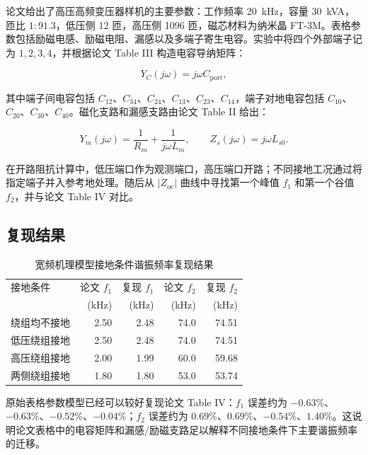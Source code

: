 \documentclass[UTF8,a4paper,12pt]{ctexart}
\begin{document}
论文给出了高压高频变压器样机的主要参数：工作频率 \SI{20}{kHz}，容量 \SI{30}{kVA}，匝比 $1:91.3$，低压侧 12 匝，高压侧 1096 匝，磁芯材料为纳米晶 FT-3M。表格参数包括励磁电感、励磁电阻、漏感以及多端子寄生电容。实验中将四个外部端子记为 $1,2,3,4$，并根据论文 Table III 构造电容导纳矩阵：

\begin{equation}
Y_C(j\omega)=j\omega C_{\mathrm{port}},
\end{equation}

其中端子间电容包括 $C_{12}$、$C_{34}$、$C_{24}$、$C_{13}$、$C_{23}$、$C_{14}$，端子对地电容包括 $C_{10}$、$C_{20}$、$C_{30}$、$C_{40}$。磁化支路和漏感支路由论文 Table II 给出：

\begin{equation}
Y_m(j\omega)=\frac{1}{R_m}+\frac{1}{j\omega L_m}, \qquad
Z_s(j\omega)=j\omega L_{s0}.
\end{equation}

在开路阻抗计算中，低压端口作为观测端口，高压端口开路；不同接地工况通过将指定端子并入参考地处理。随后从 $|Z_{\mathrm{oc}}|$ 曲线中寻找第一个峰值 $f_1$ 和第一个谷值 $f_2$，并与论文 Table IV 对比。

\subsection{复现结果}

\begin{table}[H]
\centering
\caption{宽频机理模型接地条件谐振频率复现结果}
\small
\begin{tabular}{lrrrr}
\toprule
接地条件 & 论文 $f_1$ & 复现 $f_1$ & 论文 $f_2$ & 复现 $f_2$ \\
 & (kHz) & (kHz) & (kHz) & (kHz) \\
\midrule
绕组均不接地 & 2.50 & 2.48 & 74.0 & 74.51 \\
低压绕组接地 & 2.50 & 2.48 & 74.0 & 74.51 \\
高压绕组接地 & 2.00 & 1.99 & 60.0 & 59.68 \\
两侧绕组接地 & 1.80 & 1.80 & 53.0 & 53.74 \\
\bottomrule
\end{tabular}
\end{table}

原始表格参数模型已经可以较好复现论文 Table IV：$f_1$ 误差约为 $-0.63\%$、$-0.63\%$、$-0.52\%$、$-0.04\%$；$f_2$ 误差约为 $0.69\%$、$0.69\%$、$-0.54\%$、$1.40\%$。这说明论文表格中的电容矩阵和漏感/励磁支路足以解释不同接地条件下主要谐振频率的迁移。
\end{document}
